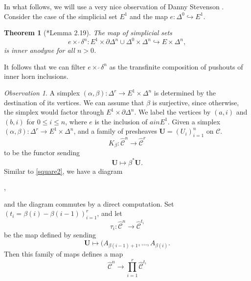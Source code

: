 \documentclass{amsart}
\numberwithin{equation}{section}
\theoremstyle{plain}   %
\newtheorem{thm}[subsection]{Theorem}
\theoremstyle{remark}
\newtheorem{obs}[subsection]{Observation}
\theoremstyle{plain}
\DeclareMathOperator{\id}{id}
\newcommand{\overcat}[2]{{\left(#1\downarrow #2\right)}}
\newcommand{\psh}[1]{\ensuremath{\widehat{#1}}}
\newcommand{\C}{\ensuremath{\mathcal{C}}}
\newcommand{\ssetlab}{\ensuremath{\widehat{\Delta} \int \widehat{\mathcal{C}}}}
\begin{document}
In what follows, we will use a very nice observation of Danny Stevenson \cite{danny}.  Consider the case of the simplicial set \(E^1\) and the map \(e:\Delta^0 \hookrightarrow E^1\).  
\begin{thm}[\cite{danny}*{Lemma 2.19}]\label{dannythm}
	The map of simplicial sets
	\[e\times^\lrcorner \delta^n: E^1\times \partial\Delta^n \cup \Delta^0 \times \Delta^n \hookrightarrow E\times \Delta^n,\]
	is inner anodyne for all \(n>0\).  
\end{thm}
It follows that we can filter \(e\times^\lrcorner \delta^n\) as the transfinite composition of pushouts of inner horn inclusions.
\begin{obs}\label{joyalsquare2}
	A simplex \((\alpha,\beta):\Delta^r \to E^1\times \Delta^n\) is determined by the destination of its vertices. We can assume that \(\beta\) is surjective, since otherwise, the simplex would factor through \(E^1\times \partial \Delta^n\).     We label the vertices by \((a,i)\) and \((b,i)\) for \(0\leq i \leq n\), where \(e\) is the inclusion of \(a in E^1\).  Given a simplex \((\alpha,\beta):\Delta^r\to E^1\times \Delta^n\), and a family of presheaves \(\mathbf{U}=(U_i)_{i=1}^n\) on \(\C\). 
	\[K_{\beta}:\psh{\C}^n \to \psh{\C}^r\]
	to be the functor sending
	\[\mathbf{U} \mapsto \beta^\ast \mathbf{U}.\]
	Similar to \ref{square2}, we have a diagram
	\begin{center}
		,
	\end{center}
	and the diagram commutes by a direct computation.  
	Set \((t_i=\beta(i) - \beta(i-1))_{i=1}^r\), and let 
	\[\tau_i:\psh{\C}^n \to \psh{\C}^{t_i}\]
	be the map defined by sending 
	\[\mathbf{U}\mapsto (A_{\beta(i-1)+1},\dots,A_{\beta(i)}.\]
	Then this family of maps defines a map 
	\[\psh{\C}^n \to \prod_{i=1}^r\psh{\C}^{t_i}\]

\end{obs}
\end{document}
